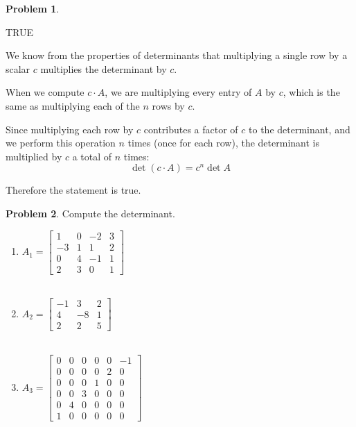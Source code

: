 \documentclass[12pt, oneside]{amsart}
\theoremstyle{definition}
\newtheorem{prob}{Problem}
\begin{document}
\begin{prob}
\begin{enumerate}
    \begin{solution}
    TRUE
    
    \vspace{0.3cm}
    
    We know from the properties of determinants that multiplying a single row by a scalar $c$ multiplies the determinant by $c$.
    
    When we compute $c \cdot A$, we are multiplying every entry of $A$ by $c$, which is the same as multiplying each of the $n$ rows by $c$.
    
    Since multiplying each row by $c$ contributes a factor of $c$ to the determinant, and we perform this operation $n$ times (once for each row), the determinant is multiplied by $c$ a total of $n$ times:
    \[
    \det(c \cdot A) = c^n \det A
    \]
    
    Therefore the statement is true.
    \end{solution}
\end{enumerate}
\end{prob}

\begin{prob} Compute the determinant.
\begin{enumerate}
    \item $A_1= \left[\begin{matrix}
        1 & 0 & -2 & 3 \\
        -3 & 1 & 1 & 2 \\
        0 & 4 & -1 & 1 \\
        2 & 3 & 0 & 1
    \end{matrix}\right]$\\\\
    
    \item $A_2= \left[\begin{matrix}
        -1 & 3 & 2 \\4 & -8 & 1 \\
        2 & 2 & 5
    \end{matrix}\right]$\\\\

    \item $A_3= \left[\begin{matrix}
        0 & 0 & 0 & 0 & 0 & -1 \\
        0 & 0 & 0 & 0 & 2 & 0 \\ 
        0 & 0 & 0 & 1 & 0 & 0 \\
        0 & 0 & 3 & 0 & 0 & 0 \\
        0 & 4 & 0 & 0 & 0 & 0 \\
        1 & 0 & 0 & 0 & 0 & 0 
    \end{matrix}\right]$
\end{enumerate}
\end{prob}
\end{document}
